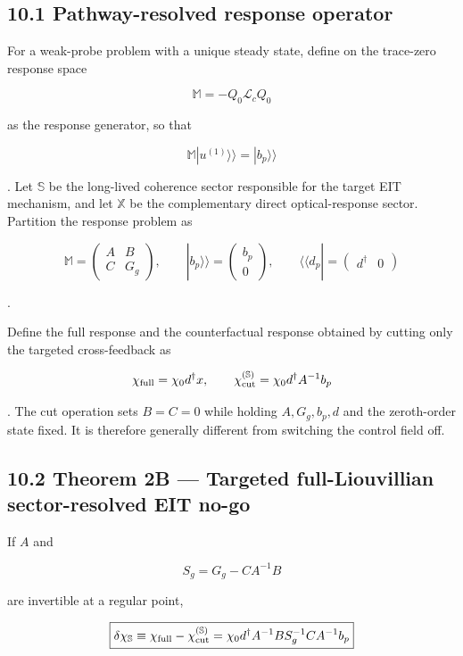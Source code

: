 \documentclass[
  10pt,
  a4paper,
]{article}
\begin{document}
\subsection{10.1 Pathway-resolved response
operator}\label{pathway-resolved-response-operator}

For a weak-probe problem with a unique steady state, define on the
trace-zero response space

\[
\mathbb M=-Q_0\mathcal L_cQ_0
\]

as the response generator, so that

\[
\mathbb M|u^{(1)}\rangle\!\rangle
=|b_p\rangle\!\rangle
\]

. Let \(\mathbb S\) be the long-lived coherence sector responsible for
the target EIT mechanism, and let \(\mathbb X\) be the complementary
direct optical-response sector. Partition the response problem as

\[
\mathbb M=
\begin{pmatrix}
A&B\\
C&G_g
\end{pmatrix},
\qquad
|b_p\rangle\!\rangle=
\begin{pmatrix}b_p\\0\end{pmatrix},
\qquad
\langle\!\langle d_p|=
\begin{pmatrix}d^\dagger&0\end{pmatrix}
\]

.

Define the full response and the counterfactual response obtained by
cutting only the targeted cross-feedback as

\[
\chi_{\rm full}
=\chi_0d^\dagger x,
\qquad
\chi_{\rm cut}^{(\mathbb S)}
=\chi_0d^\dagger A^{-1}b_p
\]

. The cut operation sets \(B=C=0\) while holding \(A,G_g,b_p,d\) and the
zeroth-order state fixed. It is therefore generally different from
switching the control field off.

\subsection{10.2 Theorem 2B --- Targeted full-Liouvillian
sector-resolved EIT
no-go}\label{theorem-2b-targeted-full-liouvillian-sector-resolved-eit-no-go}

If \(A\) and

\[
S_g=G_g-CA^{-1}B
\]

are invertible at a regular point,

\[
\boxed{
\delta\chi_{\mathbb S}
\equiv
\chi_{\rm full}-\chi_{\rm cut}^{(\mathbb S)}
=
\chi_0d^\dagger A^{-1}B
S_g^{-1}CA^{-1}b_p
}
\]
\end{document}
